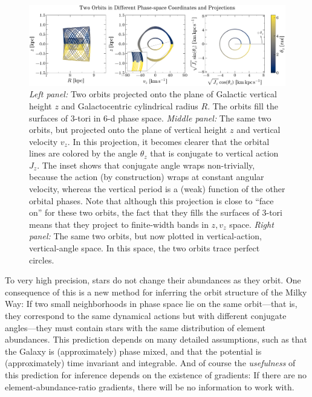 \documentclass[modern]{aastex63}
\begin{document}
\begin{figure}[!tp]
  \begin{center}
  \includegraphics[width=\textwidth]{zvz-orbit-demo.pdf}
  \end{center}
  \caption{%
    \textsl{Left panel:} Two orbits projected onto the plane of
    Galactic vertical height $z$ and Galactocentric cylindrical radius
    $R$. The orbits fill the surfaces of 3-tori in 6-d phase space.
    \textsl{Middle panel:} The same two orbits, but projected onto the plane
    of vertical height $z$ and vertical velocity $v_z$. In this projection,
    it becomes clearer that the orbital lines are
    colored by the angle $\theta_z$ that is conjugate to vertical action $J_z$.
    The inset shows that conjugate angle wraps non-trivially, because the action
    (by construction) wraps at constant angular velocity, whereas the vertical period
    is a (weak) function of the other orbital phases.
    Note that although this projection is close to ``face on'' for these two
    orbits, the fact that they fills the surfaces of 3-tori means that they
    project to finite-width bands in $z, v_z$ space.
    \textsl{Right panel:} The same two orbits, but now plotted in vertical-action,
    vertical-angle space. In this space, the two orbits trace perfect circles.
  \label{fig:zvz-demo}
  }
\end{figure}

To very high precision, stars do not change their abundances as they orbit.
One consequence of this is a new method for inferring the orbit structure of the
Milky Way:
If two small neighborhoods in phase space lie on the same orbit---that is, they
correspond to the same dynamical actions but with different conjugate
angles---they must contain stars with the same distribution of element
abundances.
This prediction depends on many detailed assumptions, such as that the Galaxy is
(approximately) phase mixed, and that the potential is (approximately) time
invariant and integrable.
And of course the \emph{usefulness} of this prediction for inference depends on
the existence of gradients: If there are no element-abundance-ratio gradients,
there will be no information to work with.
\end{document}
